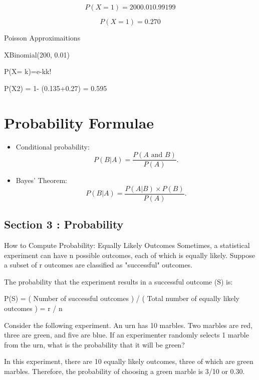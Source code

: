 \documentclass[12pt]{report}
\begin{document}
\[P(X=1) = 2000.010.99199\]

\[P(X=1) = 0.270\]


Poisson Approximaitions


XBinomial(200, 0.01) 


P(X= k)=e-kk!




P(X2) = 1- (0.135+0.27) = 0.595



\section{Probability Formulae}

\begin{itemize}
	
	\item Conditional probability:
	\begin{equation*}
	P(B|A)=\frac{P\left( A\text{ and }B\right) }{P\left( A\right) }.
	\end{equation*}
	
	
	\item Bayes' Theorem:
	\begin{equation*}
	P(B|A)=\frac{P\left(A|B\right) \times P(B) }{P\left( A\right) }.
	\end{equation*}
\end{itemize}
\subsection*{Section 3 : Probability}

How to Compute Probability: Equally Likely Outcomes
Sometimes, a statistical experiment can have n possible outcomes, each of which is equally likely. Suppose a subset of r outcomes are classified as "successful" outcomes.

The probability that the experiment results in a successful outcome (S) is:

P(S) = ( Number of successful outcomes ) / ( Total number of equally likely outcomes ) = r / n

Consider the following experiment. An urn has 10 marbles. Two marbles are red, three are green, and five are blue. If an experimenter randomly selects 1 marble from the urn, what is the probability that it will be green?

In this experiment, there are 10 equally likely outcomes, three of which are green marbles. Therefore, the probability of choosing a green marble is 3/10 or 0.30.
\end{document}
